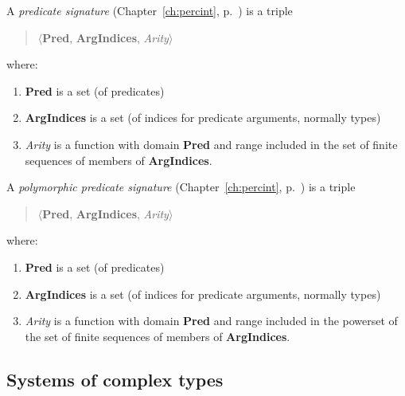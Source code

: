 A \textit{predicate signature} (Chapter~\ref{ch:percint}, p.~\pageref{ex:pred-sig})
is a triple
\begin{quote}
$\langle$\textbf{Pred}, \textbf{ArgIndices}, \textit{Arity}$\rangle$
\end{quote}
where:
\begin{enumerate} 
 
\item \textbf{Pred} is a set (of predicates)

\item \textbf{ArgIndices} is a set (of indices for predicate
  arguments, normally types)
 
\item \textit{Arity} is a function with domain \textbf{Pred} and range
  included in the set of finite sequences of members of \textbf{ArgIndices}. 
 
\end{enumerate}

\medskip

A \textit{polymorphic predicate signature} (Chapter~\ref{ch:percint}, p.~\pageref{ex:poly-pred-sig})
is a triple 
\begin{quote}
$\langle$\textbf{Pred}, \textbf{ArgIndices}, \textit{Arity}$\rangle$
\end{quote}
where:
\begin{enumerate} 
 
\item \textbf{Pred} is a set (of predicates)

\item \textbf{ArgIndices} is a set (of indices for predicate
  arguments, normally types)
 
\item \textit{Arity} is a function with domain \textbf{Pred} and range
  included in the powerset of the set of finite sequences of members
  of \textbf{ArgIndices}. 
 
\end{enumerate}
 

\subsection{Systems of complex types}
\label{app:comptypes}

